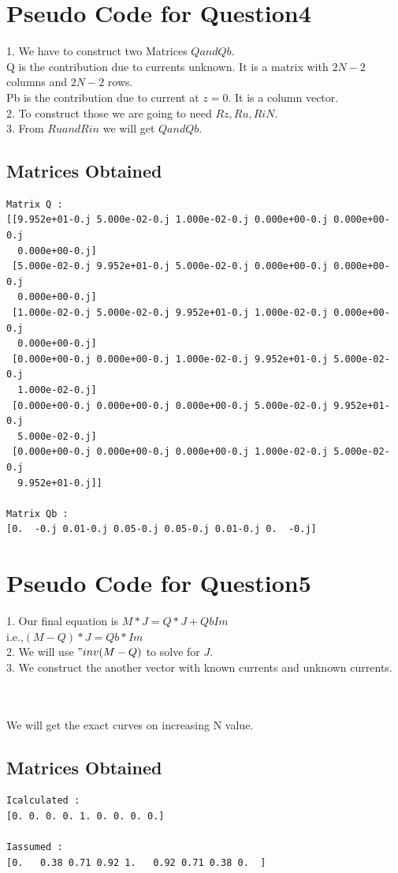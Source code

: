 \documentclass[11pt, a4paper]{article}
\begin{document}
\section{Pseudo Code for Question4}
1. We have to construct two Matrices $Q and Qb$.\\
 Q is the contribution due to currents unknown. It is a matrix with $2N−2$ columns and
$2N−2$ rows.\\
 Pb is the contribution due to current at $z=0$. It is a column vector.\\
2. To construct those we are going to need $Rz, Ru, RiN$.\\
3. From $Ru and Rin$ we will get $Q and Qb$.

\subsection{Matrices Obtained}
\begin{lstlisting}	
Matrix Q :
[[9.952e+01-0.j 5.000e-02-0.j 1.000e-02-0.j 0.000e+00-0.j 0.000e+00-0.j
  0.000e+00-0.j]
 [5.000e-02-0.j 9.952e+01-0.j 5.000e-02-0.j 0.000e+00-0.j 0.000e+00-0.j
  0.000e+00-0.j]
 [1.000e-02-0.j 5.000e-02-0.j 9.952e+01-0.j 1.000e-02-0.j 0.000e+00-0.j
  0.000e+00-0.j]
 [0.000e+00-0.j 0.000e+00-0.j 1.000e-02-0.j 9.952e+01-0.j 5.000e-02-0.j
  1.000e-02-0.j]
 [0.000e+00-0.j 0.000e+00-0.j 0.000e+00-0.j 5.000e-02-0.j 9.952e+01-0.j
  5.000e-02-0.j]
 [0.000e+00-0.j 0.000e+00-0.j 0.000e+00-0.j 1.000e-02-0.j 5.000e-02-0.j
  9.952e+01-0.j]]
  
Matrix Qb :
[0.  -0.j 0.01-0.j 0.05-0.j 0.05-0.j 0.01-0.j 0.  -0.j]

\end{lstlisting}
\newpage

\section{Pseudo Code for Question5}
1. Our final equation is $M*J = Q*J +QbIm$\\
i.e.,$(M −Q)*J = Qb*Im$\\
2. We will use $"inv(M-Q)$ to solve for $J$.\\
3. We construct the another vector with known currents and unknown currents.


\\
\\
We will get the exact curves on increasing N value.
\subsection{Matrices Obtained}
\begin{lstlisting}	
Icalculated :
[0. 0. 0. 0. 1. 0. 0. 0. 0.]

Iassumed :
[0.   0.38 0.71 0.92 1.   0.92 0.71 0.38 0.  ]

\end{lstlisting}
\end{document}
